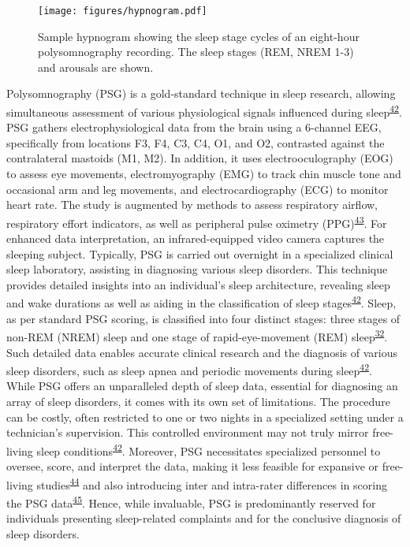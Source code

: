 \documentclass[
  10pt,
]{scrbook}
\begin{document}
\begin{figure}

{\centering \texttt{[image: figures/hypnogram.pdf]}

}

\caption{\label{fig-hypno}Sample hypnogram showing the sleep stage
cycles of an eight-hour polysomnography recording. The sleep stages
(REM, NREM 1-3) and arousals are shown.}

\end{figure}

Polysomnography (PSG) is a gold-standard technique in sleep research,
allowing simultaneous assessment of various physiological signals
influenced during
sleep\textsuperscript{\protect\hyperlink{ref-sadeh_2015}{42}}. PSG
gathers electrophysiological data from the brain using a 6-channel EEG,
specifically from locations F3, F4, C3, C4, O1, and O2, contrasted
against the contralateral mastoids (M1, M2). In addition, it uses
electrooculography (EOG) to assess eye movements, electromyography (EMG)
to track chin muscle tone and occasional arm and leg movements, and
electrocardiography (ECG) to monitor heart rate. The study is augmented
by methods to assess respiratory airflow, respiratory effort indicators,
as well as peripheral pulse oximetry
(PPG)\textsuperscript{\protect\hyperlink{ref-ibuxe1uxf1ez_2018}{43}}.
For enhanced data interpretation, an infrared-equipped video camera
captures the sleeping subject. Typically, PSG is carried out overnight
in a specialized clinical sleep laboratory, assisting in diagnosing
various sleep disorders. This technique provides detailed insights into
an individual's sleep architecture, revealing sleep and wake durations
as well as aiding in the classification of sleep
stages\textsuperscript{\protect\hyperlink{ref-sadeh_2015}{42}}. Sleep,
as per standard PSG scoring, is classified into four distinct stages:
three stages of non-REM (NREM) sleep and one stage of rapid-eye-movement
(REM) sleep\textsuperscript{\protect\hyperlink{ref-roebuck_2014}{32}}.
Such detailed data enables accurate clinical research and the diagnosis
of various sleep disorders, such as sleep apnea and periodic movements
during sleep\textsuperscript{\protect\hyperlink{ref-sadeh_2015}{42}}.
While PSG offers an unparalleled depth of sleep data, essential for
diagnosing an array of sleep disorders, it comes with its own set of
limitations. The procedure can be costly, often restricted to one or two
nights in a specialized setting under a technician's supervision. This
controlled environment may not truly mirror free-living sleep
conditions\textsuperscript{\protect\hyperlink{ref-sadeh_2015}{42}}.
Moreover, PSG necessitates specialized personnel to oversee, score, and
interpret the data, making it less feasible for expansive or free-living
studies\textsuperscript{\protect\hyperlink{ref-girschik_validation_2012}{44}}
and also introducing inter and intra-rater differences in scoring the
PSG data\textsuperscript{\protect\hyperlink{ref-levendowski_2017}{45}}.
Hence, while invaluable, PSG is predominantly reserved for individuals
presenting sleep-related complaints and for the conclusive diagnosis of
sleep disorders.
\end{document}
